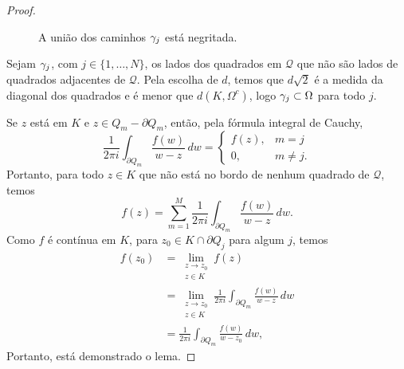 \begin{proof}
\begin{figure}[H]
        	\caption{A união dos caminhos $\gamma_j$ está negritada.}
        	\label{fig:reticulado runge}
        \end{figure}
        Sejam $\gamma_j$, com $j \in \{1, \dots, N\}$, os lados dos quadrados em $\mathcal{Q}$ 
        que não são lados de quadrados adjacentes de $\mathcal{Q}$. Pela escolha de $d$, temos 
        que $d\sqrt{2}$ é a medida da diagonal dos quadrados e é menor que $d(K, \Omega^c)$, 
        logo $\gamma_j\subset\Omega$ para todo $j$.
        
        Se $z$ está em $K$ e $z \in Q_m - \partial Q_m$, então, pela fórmula integral de Cauchy,
        \begin{equation*}
            \frac{1}{2 \pi i}\int_{\partial Q_m}\frac{f(w)}{w-z}\, dw 
            = 
            \begin{cases}
                f(z), &m = j \\
                0, &m \neq j.
            \end{cases}
        \end{equation*}
        Portanto, para todo $z\in K$ que não está no bordo de nenhum quadrado de $\mathcal{Q}$, 
        temos
        \begin{equation*}
            f(z) = \sum^{M}_{m=1}\frac{1}{2 \pi i}\int_{\partial Q_m}\frac{f(w)}{w-z}\,dw.
        \end{equation*}
        Como $f$ é contínua em $K$, para $z_0 \in K \cap \partial Q_j$ para algum $j$, temos
        \begin{align*}
            f(z_0) &= \lim_{\substack{z \to z_0 \\ z\in K}} f(z) \\
                   &= \lim_{\substack{z \to z_0 \\ z\in K}} 
                   \frac{1}{2 \pi i}\int_{\partial Q_m}\frac{f(w)}{w-z}\,dw \\
                   &= \frac{1}{2 \pi i}\int_{\partial Q_m}\frac{f(w)}{w-z_0}\,dw,
        \end{align*}
        Portanto, está demonstrado o lema.
    \end{proof}
